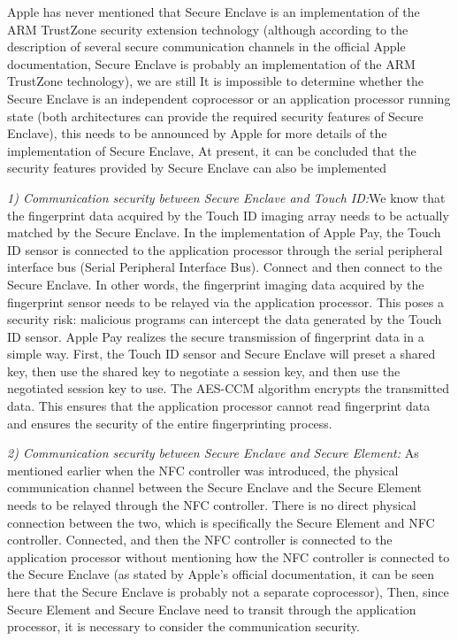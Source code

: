 \documentclass[journal]{IEEEtran}
\begin{document}
Apple has never mentioned that Secure Enclave is an implementation of the ARM TrustZone security extension technology (although according to the description of several secure communication channels in the official Apple documentation, Secure Enclave is probably an implementation of the ARM TrustZone technology), we are still It is impossible to determine whether the Secure Enclave is an independent coprocessor or an application processor running state (both architectures can provide the required security features of Secure Enclave), this needs to be announced by Apple for more details of the implementation of Secure Enclave, At present, it can be concluded that the security features provided by Secure Enclave can also be implemented

\textit{1) Communication security between Secure Enclave and Touch ID:}We know that the fingerprint data acquired by the Touch ID imaging array needs to be actually matched by the Secure Enclave. In the implementation of Apple Pay, the Touch ID sensor is connected to the application processor through the serial peripheral interface bus (Serial Peripheral Interface Bus). Connect and then connect to the Secure Enclave. In other words, the fingerprint imaging data acquired by the fingerprint sensor needs to be relayed via the application processor. This poses a security risk: malicious programs can intercept the data generated by the Touch ID sensor. Apple Pay realizes the secure transmission of fingerprint data in a simple way. First, the Touch ID sensor and Secure Enclave will preset a shared key, then use the shared key to negotiate a session key, and then use the negotiated session key to use. The AES-CCM algorithm encrypts the transmitted data. This ensures that the application processor cannot read fingerprint data and ensures the security of the entire fingerprinting process.
    
\textit{2) Communication security between Secure Enclave and Secure Element: }  
As mentioned earlier when the NFC controller was introduced, the physical communication channel between the Secure Enclave and the Secure Element needs to be relayed through the NFC controller. There is no direct physical connection between the two, which is specifically the Secure Element and NFC controller. Connected, and then the NFC controller is connected to the application processor without mentioning how the NFC controller is connected to the Secure Enclave (as stated by Apple's official documentation, it can be seen here that the Secure Enclave is probably not a separate coprocessor), Then, since Secure Element and Secure Enclave need to transit through the application processor, it is necessary to consider the communication security.
\end{document}
